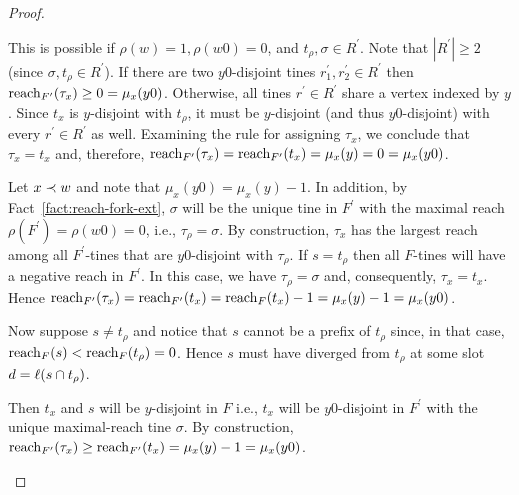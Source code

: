 \begin{proof}
\begin{description}[font=\normalfont\itshape\space]
\begin{description}[font=\normalfont\itshape\space]
					\item[If $\tau_\rho \neq t_\rho$.]
						This is possible if $\rho(w) = 1, \rho(w0) = 0$, and $t_\rho, \sigma \in R^\prime$. 
						Note that $|R^\prime| \geq 2$ (since $\sigma, t_\rho \in R^\prime$). 
						If there are two $y0$-disjoint tines $r_1^\prime, r_2^\prime \in R^\prime$ 
						then $\operatorname{reach}_{F^\prime}(\tau_x) \geq 0 = \mu_x(y0)$. 
						Otherwise, all tines $r^\prime \in R^\prime$ share a vertex indexed by $y$. 
						Since $t_x$ is $y$-disjoint with $t_\rho$, 
						it must be $y$-disjoint (and thus $y0$-disjoint) with 
						every $r^\prime \in R^\prime$ as well. 
						Examining the rule for assigning $\tau_x$, we conclude that $\tau_x = t_x$ and, 
						therefore,  
						$\operatorname{reach}_{F^\prime}(\tau_x) = \operatorname{reach}_{F^\prime}(t_x) = \mu_x(y) = 0 = \mu_x(y0)$. 
			\end{description}

		
			\item[If $\rho(w) = 0$.]
				Let $x \prec w$ and note that 
				$\mu_x(y0) = \mu_x(y) - 1$. 
				In addition, by Fact~\ref{fact:reach-fork-ext}, 
				$\sigma$ will be the unique tine in $F^\prime$ 
				with the maximal reach $\rho(F^\prime) = \rho(w0) = 0$, 
				i.e., $\tau_\rho = \sigma$.
				By construction, $\tau_x$ has the largest reach 
				among all $F^\prime$-tines that are $y0$-disjoint with $\tau_\rho$. 
				If $s = t_\rho$ 
				then all $F$-tines will have a negative reach in $F^\prime$. 
				In this case, we have $\tau_\rho = \sigma$ and, consequently, 
				$\tau_x = t_x$. 
				Hence $\operatorname{reach}_{F^\prime}(\tau_x) = \operatorname{reach}_{F^\prime}(t_x) 
				= \operatorname{reach}_{F}(t_x) - 1 = \mu_x(y) - 1 = \mu_x(y0)$. 
				
				Now suppose $s \neq t_\rho$ and notice that 
				$s$ cannot be a prefix of $t_\rho$ since, in that case, $\operatorname{reach}_F(s) < \operatorname{reach}_F(t_\rho) = 0$. 
				Hence $s$ must have diverged from $t_\rho$ at some slot $d = \ell(s \cap t_\rho)$.
				
				\begin{description}[font=\normalfont\itshape\space]
					\item[If $d > |x|$.]
						Then $t_x$ and $s$ will be $y$-disjoint in $F$ 
						i.e., $t_x$ will be $y0$-disjoint in $F^\prime$ 
						with the unique maximal-reach tine $\sigma$.
						By construction, 
						$\operatorname{reach}_{F^\prime}(\tau_x) \geq \operatorname{reach}_{F^\prime}(t_x) = \mu_x(y) - 1 = \mu_x(y0)$.


\end{description}
\end{description}
\end{proof}
